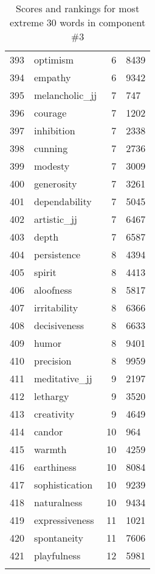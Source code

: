 \begin{longtable}[!htbp]{| rlr@{.}l |}
    393 & optimism & 6 & 8439 \\
    394 & empathy & 6 & 9342 \\
    395 & melancholic\_jj & 7 & 747 \\
    396 & courage & 7 & 1202 \\
    397 & inhibition & 7 & 2338 \\
    398 & cunning & 7 & 2736 \\
    399 & modesty & 7 & 3009 \\
    400 & generosity & 7 & 3261 \\
    401 & dependability & 7 & 5045 \\
    402 & artistic\_jj & 7 & 6467 \\
    403 & depth & 7 & 6587 \\
    404 & persistence & 8 & 4394 \\
    405 & spirit & 8 & 4413 \\
    406 & aloofness & 8 & 5817 \\
    407 & irritability & 8 & 6366 \\
    408 & decisiveness & 8 & 6633 \\
    409 & humor & 8 & 9401 \\
    410 & precision & 8 & 9959 \\
    411 & meditative\_jj & 9 & 2197 \\
    412 & lethargy & 9 & 3520 \\
    413 & creativity & 9 & 4649 \\
    414 & candor & 10 & 964 \\
    415 & warmth & 10 & 4259 \\
    416 & earthiness & 10 & 8084 \\
    417 & sophistication & 10 & 9239 \\
    418 & naturalness & 10 & 9434 \\
    419 & expressiveness & 11 & 1021 \\
    420 & spontaneity & 11 & 7606 \\
    421 & playfulness & 12 & 5981 \\
    \hline
    \caption{Scores and rankings for most extreme 30 words in component \#3} \\
\end{longtable}
